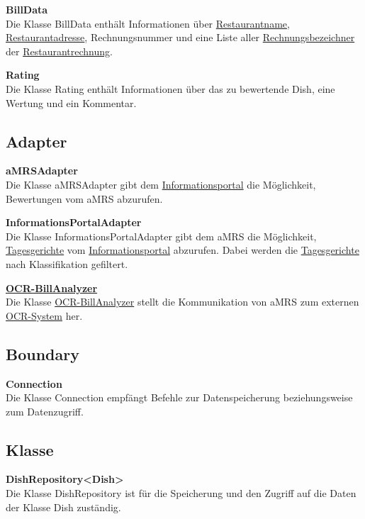 \noindent \textbf{BillData} \\
Die Klasse BillData enthält Informationen über \hyperref[gls:restaurantname]{Restaurantname}, \hyperref[gls:restaurantAdresse]{Restaurantadresse}, Rechnungsnummer und eine Liste aller
\hyperref[gls:Rechnungsbezeichner]{Rechnungsbezeichner} der \hyperref[gls:restaurantRechnung]{Restaurantrechnung}.
\newline

\noindent \textbf{Rating} \\
Die Klasse Rating enthält Informationen über das zu bewertende Dish, eine Wertung und ein Kommentar.

\subsection*{Adapter}
\noindent \textbf{aMRSAdapter}\\
Die Klasse aMRSAdapter gibt dem \hyperref[gls:informationsportal]{Informationsportal} die Möglichkeit, Bewertungen vom \ac{aMRS} abzurufen.
\newline

\noindent \textbf{InformationsPortalAdapter}\\
Die Klasse InformationsPortalAdapter gibt dem \ac{aMRS} die Möglichkeit, \hyperref[gls:tagesgericht]{Tagesgerichte} vom \hyperref[gls:informationsportal]{Informationsportal} abzurufen.
Dabei werden die \hyperref[gls:tagesgericht]{Tagesgerichte} nach Klassifikation gefiltert.
\newline

\noindent \hyperref[gls:ocr-System]{\textbf{OCR-BillAnalyzer}}\\
Die Klasse \hyperref[gls:ocr-System]{OCR-BillAnalyzer} stellt die Kommunikation von \ac{aMRS} zum externen \hyperref[gls:ocr-System]{OCR-System} her.


\subsection*{Boundary}
\noindent \textbf{Connection}\\
Die Klasse Connection empfängt Befehle zur Datenspeicherung beziehungsweise zum Datenzugriff.

\subsection*{Klasse}
\noindent \textbf{DishRepository<Dish>}\\
Die Klasse DishRepository ist für die Speicherung und den Zugriff auf die Daten der Klasse Dish zuständig.
\newline

